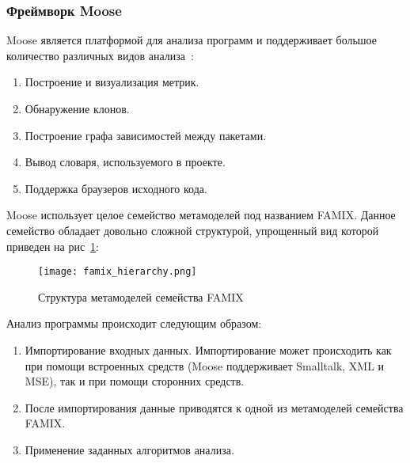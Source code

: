 \subsubsection{Фреймворк Moose}

Moose является платформой для анализа программ и поддерживает большое количество
различных видов анализа~\cite{moose}:

\begin{enumerate}
    \item Построение и визуализация метрик.
    \item Обнаружение клонов.
    \item Построение графа зависимостей между пакетами.
    \item Вывод словаря, используемого в проекте.
    \item Поддержка браузеров исходного кода.
\end{enumerate}


Moose использует целое семейство метамоделей под названием FAMIX. Данное
семейство обладает довольно сложной структурой, упрощенный вид которой приведен
на рис~\ref{fig:famix_hierarchy}:

\begin{figure}[ht!]
     \begin{center}
         \texttt{[image: famix\_hierarchy.png]}
     \end{center}
     \caption{Структура метамоделей семейства FAMIX}
     \label{fig:famix_hierarchy}
\end{figure}
\newpage

Анализ программы происходит следующим образом:

\begin{enumerate}
    \item Импортирование входных данных. Импортирование может происходить как
    при помощи встроенных средств (Moose поддерживает Smalltalk, XML и MSE),
    так и при помощи сторонних средств.
    \item После импортирования данные приводятся к одной из метамоделей
    семейства FAMIX.
    \item Применение заданных алгоритмов анализа.
\end{enumerate}

